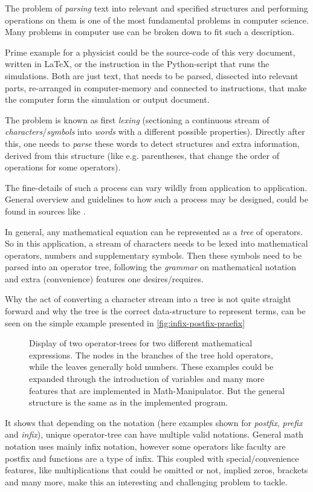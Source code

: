 The problem of \emph{parsing} text into relevant and specified structures and performing operations on them is one of the most fundamental problems in computer science. 
Many problems in computer use can be broken down to fit such a description.

Prime example for a physicist could be the source-code of this very document, written in \LaTeX, or the instruction in the Python-script that runs the simulations. 
Both are just text, that needs to be parsed, dissected into relevant parts, re-arranged in computer-memory and connected to instructions, that make the computer form the simulation or output document.

The problem is known as first \emph{lexing} (sectioning a continuous stream of \emph{characters}/\emph{symbols} into \emph{words} with a different possible properties).
Directly after this, one needs to \emph{parse} these words to detect structures and extra information, derived from this structure (like e.g. parentheses, that change the order of operations for some operators).

The fine-details of such a process can vary wildly from application to application. 
General overview and guidelines to how such a process may be designed, could be found in sources like \cite{compilersDragonBook}.

In general, any mathematical equation can be represented as a \emph{tree} of operators.
So in this application, a stream of characters needs to be lexed into mathematical operators, numbers and supplementary symbols.
Then these symbols need to be parsed into an operator tree, following the \emph{grammar} on mathematical notation and extra (convenience) features one desires/requires. 

Why the act of converting a character stream into a tree is not quite straight forward and why the tree is the correct data-structure to represent terms, can be seen on the simple example presented in \autoref{fig:infix-postfix-praefix}

\begin{figure}[htbp]
            
    \vspace{0.8cm}
    \caption{Display of two operator-trees for two different mathematical expressions. 
    The nodes in the branches of the tree hold operators, while the leaves generally hold numbers. These examples could be expanded through the introduction of variables and many more features that are implemented in Math-Manipulator. But the general structure is the same as in the implemented program.}
    \label{fig:infix-postfix-praefix}
\end{figure}

It shows that depending on the notation (here examples shown for \emph{postfix}, \emph{prefix} and \emph{infix}), unique operator-tree can have multiple valid notations. 
General math notation uses mainly infix notation, however some operators like faculty are postfix and functions are a type of infix.
This coupled with special/convenience features, like multiplications that could be omitted or not, implied zeros, brackets and many more, make this an interesting and challenging problem to tackle.